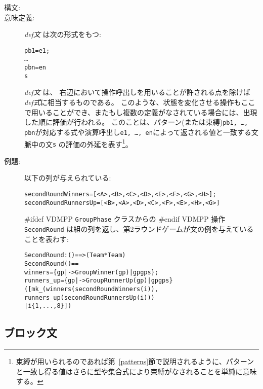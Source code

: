 \documentclass[\pformat,12pt]{jarticle}
\begin{document}
\begin{description}
\item[構文:]



\item[意味定義:] {\it def文} は次の形式をもつ:
  \begin{alltt}
     pb1 = e1;
        \ldots
        pbn = en
      s
  \end{alltt}
  {\it def文} は、 右辺において操作呼出しを用いることが許される点を除けば{\it def式}に相当するものである。 
このような、状態を変化させる操作もここで用いることができ、またもし複数の定義がなされている場合には、出現した順に評価が行われる。 
 このことは、パターン(または束縛){\tt pb1, \ldots, pbn}が対応する式や演算呼出し{\tt e1, \ldots, en}によって返される値と一致する文脈中の文{\tt s} の評価の外延を表す\footnote{束縛が用いられるのであれば第~\ref{patterns}節で説明されるように、パターンと一致し得る値はさらに型や集合式により束縛がなされることを単純に意味する。}。

\item[例題:]  以下の列が与えられている:
  \begin{alltt}
  secondRoundWinners = [<A>,<B>,<C>,<D>,<E>,<F>,<G>,<H>];
  secondRoundRunnersUp = [<B>,<A>,<D>,<C>,<F>,<E>,<H>,<G>]
  \end{alltt}
#ifdef VDMPP
 \texttt{GroupPhase} クラスからの
#endif VDMPP
操作\texttt{SecondRound}%
は組の列を返し、第2ラウンドゲームが文の例を与えていることを表わす:
  \begin{alltt}
  SecondRound : () ==>  (Team * Team)
  SecondRound () ==
   winners = \{ gp |-> GroupWinner(gp) | gp  gps \};
     runners_up = \{ gp |-> GroupRunnerUp(gp) | gp  gps\}
   ([mk_(winners(secondRoundWinners(i)),
                runners_up(secondRoundRunnersUp(i))) 
           | i  \{1,...,8\}])
  \end{alltt}

\end{description}

\subsection{ブロック文} \label{dcl-stmt}
\end{document}
